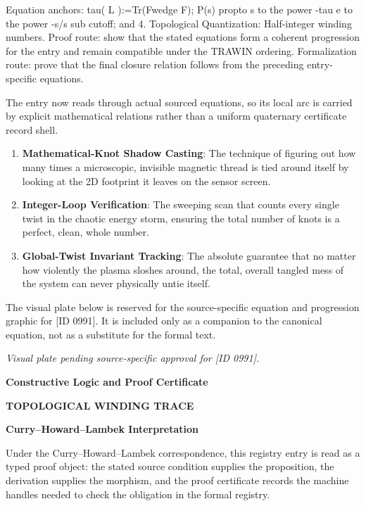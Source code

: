 Equation anchors: tau( L ):=Tr(Fwedge F); P(s) propto s to the power -tau e to the power -s/s sub cutoff; and 4. Topological Quantization: Half-integer winding numbers. Proof route: show that the stated equations form a coherent progression for the entry and remain compatible under the TRAWIN ordering. Formalization route: prove that the final closure relation follows from the preceding entry-specific equations.

The entry now reads through actual sourced equations, so its local arc is carried by explicit mathematical relations rather than a uniform quaternary certificate record shell.
\endgroup

\begin{enumerate}[leftmargin=1.6em,itemsep=6pt,topsep=4pt]
\item \textbf{Mathematical-Knot Shadow Casting}: The technique of figuring out how many times a microscopic, invisible magnetic thread is tied around itself by looking at the 2D footprint it leaves on the sensor screen.
\item \textbf{Integer-Loop Verification}: The sweeping scan that counts every single twist in the chaotic energy storm, ensuring the total number of knots is a perfect, clean, whole number.
\item \textbf{Global-Twist Invariant Tracking}: The absolute guarantee that no matter how violently the plasma sloshes around, the total, overall tangled mess of the system can never physically untie itself.
\end{enumerate}

\begingroup\footnotesize\sloppy
The visual plate below is reserved for the source-specific equation and progression graphic for [ID 0991]. It is included only as a companion to the canonical equation, not as a substitute for the formal text.
\par\endgroup
\begingroup\footnotesize\itshape
Visual plate pending source-specific approval for [ID 0991].
\par\endgroup

\clearpage
\begingroup\tzpsupportsetup
\noindent\textbf{\fontsize{10.8pt}{12.8pt}\selectfont [ID 0991] Constructive Logic and Proof Certificate}\par
\noindent\textbf{\fontsize{10pt}{12pt}\selectfont TOPOLOGICAL WINDING TRACE}\par
\vspace{0.45em}
\begingroup
\footnotesize
\setlength{\parskip}{0.22em}
\setlength{\parindent}{0pt}
\noindent\textbf{Curry--Howard--Lambek Interpretation}\par
Under the Curry--Howard--Lambek correspondence, this registry entry is read as a typed proof
object: the stated source condition supplies the proposition, the derivation supplies the
morphism, and the proof certificate records the machine handles needed to check the obligation
in the formal registry.

